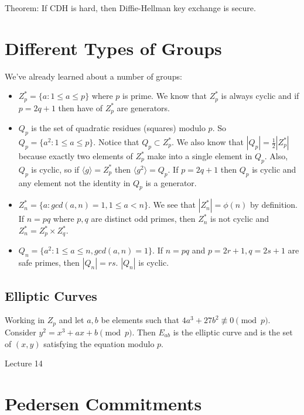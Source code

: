 \documentclass[psamsfonts]{amsart}
\begin{document}
Theorem: If CDH is hard, then Diffie-Hellman key exchange is secure.

\section{Different Types of Groups}

We've already learned about a number of groups:
\begin{itemize}
  \item $Z_{p}^* = \{a : 1 \leq a \leq p \}$ where $p$ is prime. We know that $Z_{p}^*$ is always cyclic and if $p=2q+1$ then have of $Z_p^*$ are generators.
  \item $Q_p$ is the set of quadratic residues (squares) modulo $p$. So $Q_p = \{a^2 : 1 \leq a \leq p \}$. Notice that $Q_p \subset Z_p^*$. We also know that $|Q_p| = \frac{1}{2} |Z_p^*|$ because exactly two elements of $Z_p^*$ make into a single element in $Q_p$. Also, $Q_p$ is cyclic, so if $\langle g \rangle = Z_p^*$ then $\langle g^2 \rangle = Q_p$. If $p = 2q + 1$ then $Q_p$ is cyclic and any element not the identity in $Q_p$ is a generator.
  \item $Z_n^* = \{a : gcd(a,n) = 1, 1 \leq a < n \}$. We see that $|Z_{n}^*| = \phi(n)$ by definition. If $n = pq$ where $p,q$ are distinct odd primes, then $Z_n^*$ is not cyclic and $Z_n^* = Z_p^* \times Z_q^*$. 
  \item $Q_n = \{a^2 : 1 \leq a \leq n, gcd(a,n) = 1 \}$. If $n = pq$ and $p = 2r+1, q = 2s+1$ are safe primes, then $|Q_n| = rs$. $|Q_n|$ is cyclic.
\end{itemize}

\subsection{Elliptic Curves}

Working in $Z_p$ and let $a,b$ be elements such that $4a^3 + 27b^2 \not \equiv 0 \pmod{p}$. Consider $y^2 = x^3 +ax + b \pmod{p}$. Then $E_{ab}$ is the elliptic curve and is the set of $(x,y)$ satisfying the equation modulo $p$. 


\newpage
\Large{Lecture 14}


\maketitle

\section{Pedersen Commitments}
\end{document}
